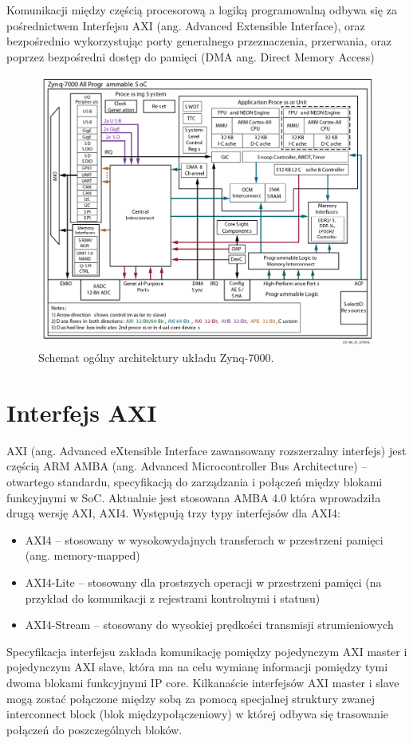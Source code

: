 Komunikacji między częścią procesorową a logiką programowalną odbywa się za pośrednictwem Interfejsu AXI (ang. Advanced Extensible Interface), oraz bezpośrednio wykorzystując porty generalnego przeznaczenia, przerwania, oraz poprzez bezpośredni dostęp do pamięci (DMA ang. Direct Memory Access) 

\begin{figure}[h]
    \centering
    \includegraphics[width=1\textwidth]{images/Zynq-7000-Overview}
    \caption{Schemat ogólny architektury układu Zynq-7000.}
    \label{fig:zynq7000}
\end{figure}

\section{Interfejs AXI}
 AXI (ang. Advanced eXtensible Interface zawansowany rozszerzalny interfejs) jest częścią ARM AMBA (ang. Advanced Microcontroller Bus Architecture) – otwartego standardu, specyfikacją do zarządzania i połączeń między blokami funkcyjnymi w SoC. Aktualnie jest stosowana AMBA 4.0 która wprowadziła drugą wersję AXI, AXI4. Występują trzy typy interfejsów dla AXI4:
\begin{itemize}
\item AXI4 – stosowany w wysokowydajnych transferach w przestrzeni pamięci (ang. memory-mapped)
\item AXI4-Lite – stosowany dla prostszych operacji w przestrzeni pamięci (na przykład do komunikacji z rejestrami kontrolnymi i statusu)
\item AXI4-Stream – stosowany do wysokiej prędkości transmisji strumieniowych
\end{itemize}
Specyfikacja interfejsu zakłada komunikację pomiędzy pojedynczym AXI master i pojedynczym AXI slave, która ma na celu wymianę informacji pomiędzy tymi dwoma blokami funkcyjnymi IP core. Kilkanaście interfejsów AXI master i slave mogą zostać połączone między sobą za pomocą specjalnej struktury zwanej interconnect block (blok międzypołączeniowy) w której odbywa się trasowanie połączeń do poszczególnych bloków. 

